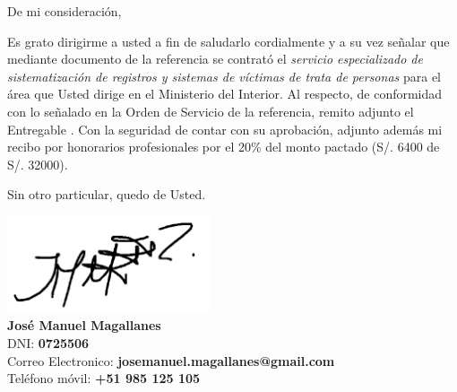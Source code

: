 \documentclass[letterpaper,11pt]{texMemo} %
\begin{document}


\clearpage\maketitle
\thispagestyle{empty}

\noindent De mi consideraci\'{o}n,

Es grato dirigirme a usted a fin de saludarlo cordialmente y a su vez se\~{n}alar que mediante documento de la referencia se contrat\'{o} el \emph{servicio especializado de sistematizaci\'{o}n de registros y sistemas de v\'{i}ctimas de trata de personas} para el \'{a}rea que Usted dirige en el  Ministerio del Interior. Al respecto, de conformidad con lo se\~{n}alado en la Orden de Servicio de la referencia, remito adjunto el Entregable . Con la seguridad de contar con su aprobaci\'{o}n, adjunto adem\'{a}s mi recibo por honorarios profesionales por el 20\% del monto pactado (S/. 6400 de S/. 32000). 

Sin otro particular, quedo de Usted. 




\vspace{75px}
\noindent
\includegraphics[width=6cm]{firma}\\
{\bf Jos\'{e} Manuel Magallanes}\\
DNI: {\bf 0725506}\\
Correo Electronico: {\bf josemanuel.magallanes@gmail.com}\\
Tel\'{e}fono m\'{o}vil: {\bf +51 985 125 105}


\end{document}
